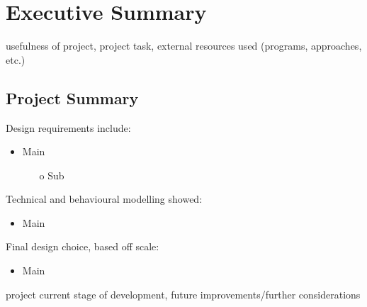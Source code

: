 \documentclass[11pt, a4paper]{article}
\begin{document}
\setafport

    
    
 
    \newpage %

\section*{Executive Summary}

    usefulness of project, project task, external resources used (programs, approaches, etc.)

    \subsection*{Project Summary}
    
        Design requirements include:
        \vspace{-0.7\topsep} 
        \begin{itemize}
            \item Main
            \begin{itemize}
                \item[o] Sub
            \end{itemize}
        \end{itemize}
        
        Technical and behavioural modelling showed:
        \vspace{-0.7\topsep}
        \begin{itemize}
            \item Main
        \end{itemize}
        
        Final design choice, based off scale:
        \vspace{-0.7\topsep}
        \begin{itemize}
            \item Main
        \end{itemize}
        
        project current stage of development, future improvements/further considerations
        
\newpage
\tableofcontents 
\listoffigures 
\listoftables 
\end{document}
